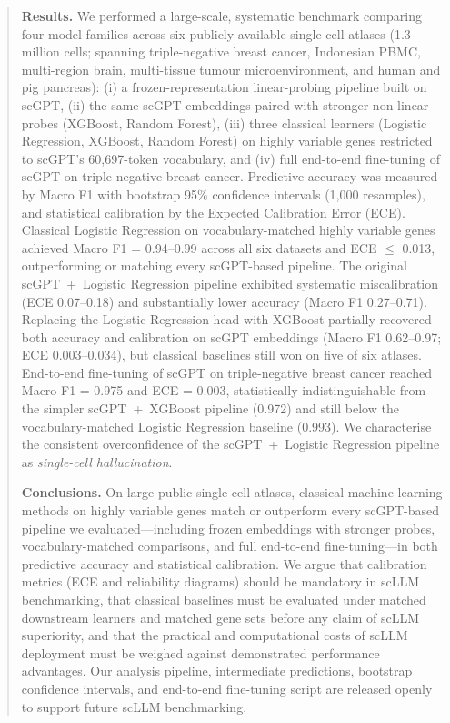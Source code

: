 \documentclass[11pt,a4paper]{article}
\begin{document}
\begin{titlepage}
\begin{center}
\begin{abstract}
\noindent
\textbf{Results.} We performed a large-scale, systematic benchmark comparing four model families across six publicly available single-cell atlases (1.3 million cells; spanning triple-negative breast cancer, Indonesian PBMC, multi-region brain, multi-tissue tumour microenvironment, and human and pig pancreas): (i) a frozen-representation linear-probing pipeline built on scGPT, (ii) the same scGPT embeddings paired with stronger non-linear probes (XGBoost, Random Forest), (iii) three classical learners (Logistic Regression, XGBoost, Random Forest) on highly variable genes restricted to scGPT's 60{,}697-token vocabulary, and (iv) full end-to-end fine-tuning of scGPT on triple-negative breast cancer. Predictive accuracy was measured by Macro F1 with bootstrap 95\% confidence intervals (1{,}000 resamples), and statistical calibration by the Expected Calibration Error (ECE). Classical Logistic Regression on vocabulary-matched highly variable genes achieved Macro F1 = 0.94--0.99 across all six datasets and ECE $\leq$ 0.013, outperforming or matching every scGPT-based pipeline. The original scGPT~+~Logistic Regression pipeline exhibited systematic miscalibration (ECE 0.07--0.18) and substantially lower accuracy (Macro F1 0.27--0.71). Replacing the Logistic Regression head with XGBoost partially recovered both accuracy and calibration on scGPT embeddings (Macro F1 0.62--0.97; ECE 0.003--0.034), but classical baselines still won on five of six atlases. End-to-end fine-tuning of scGPT on triple-negative breast cancer reached Macro F1 = 0.975 and ECE = 0.003, statistically indistinguishable from the simpler scGPT~+~XGBoost pipeline (0.972) and still below the vocabulary-matched Logistic Regression baseline (0.993). We characterise the consistent overconfidence of the scGPT~+~Logistic Regression pipeline as \textit{single-cell hallucination}.

\noindent
\textbf{Conclusions.} On large public single-cell atlases, classical machine learning methods on highly variable genes match or outperform every scGPT-based pipeline we evaluated---including frozen embeddings with stronger probes, vocabulary-matched comparisons, and full end-to-end fine-tuning---in both predictive accuracy and statistical calibration. We argue that calibration metrics (ECE and reliability diagrams) should be mandatory in scLLM benchmarking, that classical baselines must be evaluated under matched downstream learners and matched gene sets before any claim of scLLM superiority, and that the practical and computational costs of scLLM deployment must be weighed against demonstrated performance advantages. Our analysis pipeline, intermediate predictions, bootstrap confidence intervals, and end-to-end fine-tuning script are released openly to support future scLLM benchmarking.
\end{abstract}


\end{center}
\end{titlepage}
\end{document}
